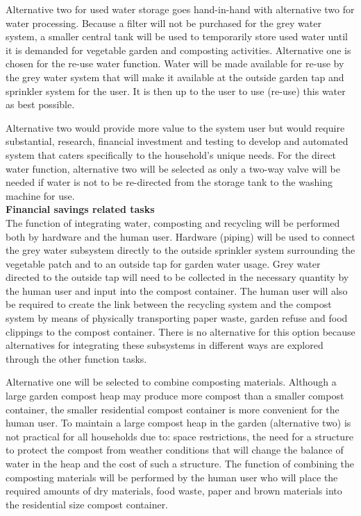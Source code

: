 \documentclass[a4paper,11pt,fleqn]{report}
\begin{document}
Alternative two for used water storage goes hand-in-hand with alternative two for water processing. Because a filter will not be purchased for the grey water system, a smaller central tank will be used to temporarily store used water until it is demanded for vegetable garden and composting activities. Alternative one is chosen for the re-use water function. Water will be made available for re-use by the grey water system that will make it available at the outside garden tap and sprinkler system for the user. It is then up to the user to use (re-use) this water as best possible.

Alternative two would provide more value to the system user but would require substantial, research, financial investment and testing to develop and automated system that caters specifically to the household's unique needs. For the direct water function, alternative two will be selected as only a two-way valve will be needed if water is not to be re-directed from the storage tank to the washing machine for use.\\

\textbf{Financial savings related tasks}\\
The function of integrating water, composting and recycling will be performed both by hardware and the human user. Hardware (piping) will be used to connect the grey water subsystem directly to the outside sprinkler system surrounding the vegetable patch and to an outside tap for garden water usage. Grey water directed to the outside tap will need to be collected in the necessary quantity by the human user and input into the compost container. The human user will also be required to create the link between the recycling system and the compost system by means of physically transporting paper waste, garden refuse and food clippings to the compost container. There is no alternative for this option because alternatives for integrating these subsystems in different ways are explored through the other function tasks.

Alternative one will be selected to combine composting materials. Although a large garden compost heap may produce more compost than a smaller compost container, the smaller residential compost container is more convenient for the human user. To maintain a large compost heap in the garden (alternative two) is not practical for all households due to: space restrictions, the need for a structure to protect the compost from weather conditions that will change the balance of water in the heap and the cost of such a structure. The function of combining the composting materials will be performed by the human user who will place the required amounts of dry materials, food waste, paper and brown materials into the residential size compost container.
\end{document}

